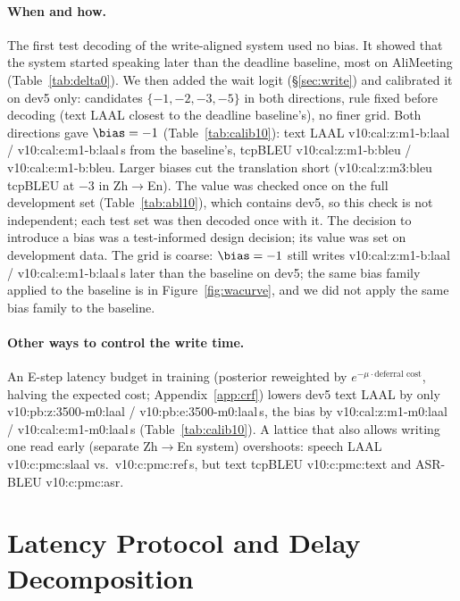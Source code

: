 \paragraph{When and how.} The first test decoding of the write-aligned system used no bias. It showed that the
system started speaking later than the deadline baseline, most on AliMeeting (Table~\ref{tab:delta0}). We then added
the wait logit (\S\ref{sec:write}) and calibrated it on dev5 only: candidates $\{-1,-2,-3,-5\}$ in both directions, rule fixed before
decoding (text LAAL closest to the deadline baseline's), no finer grid. Both directions gave $\bias=-1$
(Table~\ref{tab:calib10}): text LAAL \num{v10:cal:z:m1-b:laal} / \num{v10:cal:e:m1-b:laal}\,s from the baseline's,
tcpBLEU \num{v10:cal:z:m1-b:bleu} / \num{v10:cal:e:m1-b:bleu}. Larger biases cut the translation short
(\num{v10:cal:z:m3:bleu} tcpBLEU at $-3$ in Zh$\rightarrow$En). The value was checked once on the full development set
(Table~\ref{tab:abl10}), which contains dev5, so this check is not independent; each test set was then decoded once with
it. The decision to introduce a bias was a test-informed design decision; its value was set on development data. The
grid is coarse: $\bias=-1$ still writes \num{v10:cal:z:m1-b:laal} / \num{v10:cal:e:m1-b:laal}\,s later than the baseline
on dev5\ifWAcurve{}; the same bias family applied to the baseline is in Figure~\ref{fig:wacurve}\else{}, and we did not apply the same bias family to the baseline\fi.

\paragraph{Other ways to control the write time.} An E-step latency budget in training (posterior reweighted by
$e^{-\mu\cdot\text{deferral cost}}$, halving the expected cost; Appendix~\ref{app:crf}) lowers dev5 text LAAL by
only \num{v10:pb:z:3500-m0:laal} / \num{v10:pb:e:3500-m0:laal}\,s, the bias by \num{v10:cal:z:m1-m0:laal} /
\num{v10:cal:e:m1-m0:laal}\,s (Table~\ref{tab:calib10}). A lattice that also allows writing one read early (separate
Zh$\rightarrow$En system) overshoots: speech LAAL \num{v10:c:pmc:slaal} vs.\ \num{v10:c:pmc:ref}\,s, but text tcpBLEU
\num{v10:c:pmc:text} and ASR-BLEU \num{v10:c:pmc:asr}.





\section{Latency Protocol and Delay Decomposition}
\label{app:chunk}

